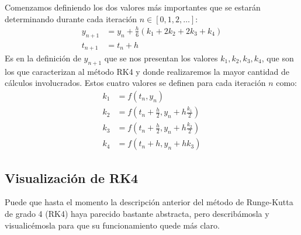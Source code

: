 \documentclass[12pt, a4paper]{article}
\begin{document}
Comenzamos definiendo los dos valores más importantes que se estarán determinando durante cada iteración \(n \in [0, 1, 2, \dots]\):
\begin{align*}
	y_{n+1} &= y_{n} + \frac{h}{6} \left( k_{1} + 2k_{2} + 2k_{3} + k_{4} \right) \\[0.5em]
	t_{n+1} &= t_{n} + h
\end{align*}
Es en la definición de \(y_{n+1}\) que se nos presentan los valores \(k_{1}, k_{2}, k_{3}, k_{4}\), que son los que caracterizan al método RK4 y donde realizaremos la mayor cantidad de cálculos involucrados. Estos cuatro valores se definen para cada iteración \(n\) como:
\begin{align*}
	k_{1} &= f(t_{n}, y_{n}) \\
	k_{2} &= f \left( t_{n} + \frac{h}{2}, y_{n} + h \frac{k_{1}}{2} \right) \\
	k_{3} &= f \left( t_{n} + \frac{h}{2}, y_{n} + h \frac{k_{2}}{2} \right) \\
	k_{4} &= f(t_{n} + h, y_{n} + hk_{3})
\end{align*}

\subsection{Visualización de RK4}

Puede que hasta el momento la descripción anterior del método de Runge-Kutta de grado 4 (RK4) haya parecido bastante abstracta, pero describámosla y visualicémosla para que su funcionamiento quede más claro.
\end{document}
